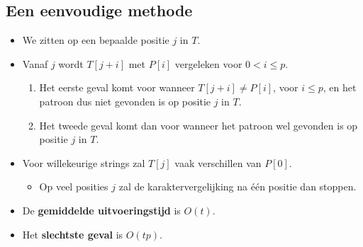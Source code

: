 \subsection{Een eenvoudige methode}
\begin{itemize}
    \item We zitten op een bepaalde positie $j$ in $T$.
    \item Vanaf $j$ wordt $T[j + i]$ met $P[i]$ vergeleken voor $0 < i \leq p$.
    \begin{enumerate}
        \item Het eerste geval komt voor wanneer $T[j + i] \neq P[i]$, voor $i \leq p$, en het patroon dus niet gevonden is op positie $j$ in $T$.
        \item Het tweede geval komt dan voor wanneer het patroon wel gevonden is op positie $j$ in $T$.
    \end{enumerate}
    \item Voor willekeurige strings zal $T[j]$ vaak verschillen van $P[0]$.
    \begin{itemize}
        \item Op veel posities $j$ zal de karaktervergelijking na één positie dan stoppen.
    \end{itemize}
    \item De \textbf{gemiddelde uitvoeringstijd} is $O(t)$.
    \item Het \textbf{slechtste geval} is $O(tp)$.
\end{itemize}

